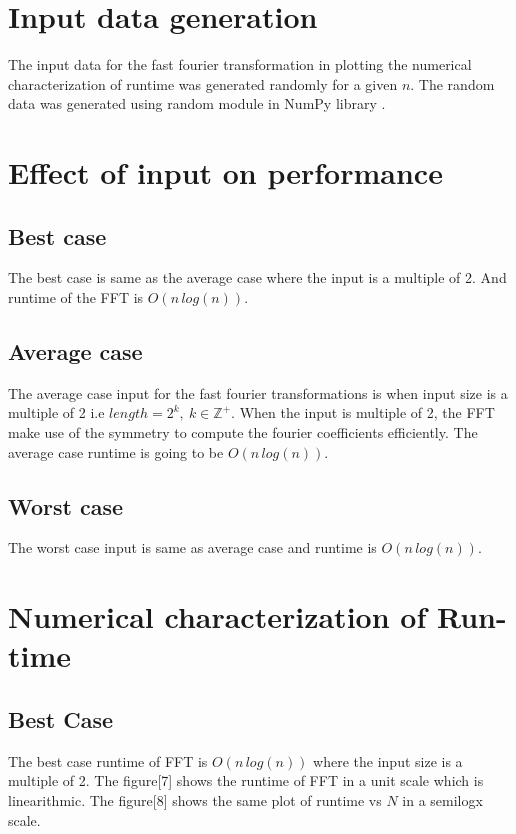 \documentclass[preprint,12pt]{elsarticle}
\begin{document}
\section{Input data generation}
The input data for the fast fourier transformation in plotting the numerical characterization of runtime was generated randomly for a given $n$. The random data was generated using random module in NumPy library . 

\section{Effect of input on performance}
\subsection{Best case}
The best case is same as the average case where the input is a multiple of 2. And runtime of the FFT is $O(n\,log(n))$.

\subsection{Average case}
The average case input for the fast fourier transformations is when input size is a multiple of 2 i.e  $length=2^k,\ k \in \mathbb{Z}^+$. When the input is multiple of 2, the FFT make use of the symmetry to compute the fourier coefficients efficiently. The average case runtime is going to be $O(n\,log(n))$.

\subsection{Worst case}
The worst case input is same as average case and runtime is $O(n\,log(n))$.

\section{Numerical characterization of Run-time}
\subsection{Best Case}
The best case runtime of FFT is $O(n\,log(n))$ where the input size is a multiple of 2. The figure[7] shows the runtime of FFT in a unit scale which is linearithmic. The figure[8] shows the same plot of runtime vs $N$ in a semilogx scale.
\end{document}
